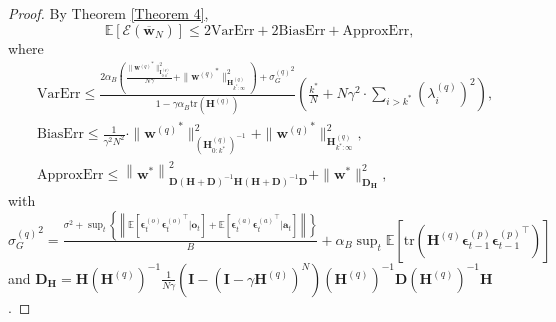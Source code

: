 \documentclass[11pt, letterpaper]{article}
\begin{document}
\begin{proof}
    By Theorem \ref{Theorem 4},
    \begin{equation*}
        \mathbb{E}[\mathcal E(\overline{\mathbf{w}}_N)]\leq 2\mathrm{VarErr}+2\mathrm{BiasErr}+\mathrm{ApproxErr},
    \end{equation*}
    where
    \begin{equation*}
        \begin{aligned}
            &\mathrm{VarErr}\leq\frac{2\alpha_B\left(\frac{\|{\mathbf{w}^{(q)}}^*\|_{\mathbf{I}_{0:k^*}^{(q)}}^2}{N\gamma}+\|{\mathbf{w}^{(q)}}^*\|_{\mathbf{H}_{k^*:\infty}^{(q)}}^2\right)+{\sigma_G^{(q)}}^2}{1-\gamma\alpha_B\mathrm{tr}(\mathbf{H}^{(q)})}\left(\frac{k^*}{N}+N\gamma^2\cdot\sum_{i>k^*}(\lambda_i^{(q)})^2\right),\\
            &\mathrm{BiasErr}\leq\frac{1}{\gamma^2N^2}\cdot\|{\mathbf{w}^{(q)}}^*\|_{(\mathbf{H}_{0:k^*}^{(q)})^{-1}}^2+\|{\mathbf{w}^{(q)}}^*\|_{\mathbf{H}_{k^*:\infty}^{(q)}}^2,\\
            &\mathrm{ApproxErr}\leq\left\|\mathbf{w}^*\right\|_{\mathbf{D}(\mathbf{H}+\mathbf{D})^{-1}\mathbf{H}(\mathbf{H}+\mathbf{D})^{-1}\mathbf{D}}^2+\|\mathbf{w}^*\|_{\mathbf{D}_\mathbf{H}}^2,
        \end{aligned}
    \end{equation*}
    with ${\sigma_G^{(q)}}^2=\frac{\sigma^2+\sup_t \left\{\left\|\mathbb{E}\left[\boldsymbol{\epsilon}_t^{(o)}{\boldsymbol{\epsilon}_t^{(o)}}^\top|\mathbf{o}_t\right]+\mathbb{E}\left[\boldsymbol{\epsilon}_t^{(a)}{\boldsymbol{\epsilon}_t^{(a)}}^\top|\mathbf{a}_t\right] \right\|\right\}}{B}+\alpha_B\sup_t\mathbb{E}\left[\mathrm{tr}\left(\mathbf{H}^{(q)} \boldsymbol{\epsilon}_{t-1}^{(p)}{\boldsymbol{\epsilon}_{t-1}^{(p)}}^\top\right)\right]$ and $\mathbf{D}_{\mathbf{H}}=\mathbf{H}(\mathbf{H}^{(q)})^{-1}\frac{1}{N\gamma}\left(\mathbf{I}-(\mathbf{I}-\gamma\mathbf{H}^{(q)})^N\right)(\mathbf{H}^{(q)})^{-1}\mathbf{D}(\mathbf{H}^{(q)})^{-1}\mathbf{H}$.
    

\end{proof}
\end{document}
